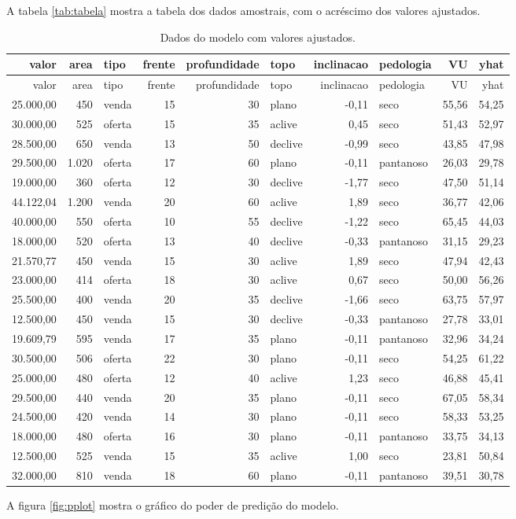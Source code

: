 \documentclass[a4paper, 12pt]{article}
\begin{document}
A tabela \ref{tab:tabela} mostra a tabela dos dados amostrais, com o
acréscimo dos valores ajustados.

\begin{longtable}[]{@{}rrlrrlrlrr@{}}
\caption{Dados do modelo com valores ajustados.}\tabularnewline
\toprule
valor & area & tipo & frente & profundidade & topo & inclinacao &
pedologia & VU & yhat\tabularnewline
\midrule
\endfirsthead
\toprule
valor & area & tipo & frente & profundidade & topo & inclinacao &
pedologia & VU & yhat\tabularnewline
\midrule
\endhead
25.000,00 & 450 & venda & 15 & 30 & plano & -0,11 & seco & 55,56 &
54,25\tabularnewline
30.000,00 & 525 & oferta & 15 & 35 & aclive & 0,45 & seco & 51,43 &
52,97\tabularnewline
28.500,00 & 650 & venda & 13 & 50 & declive & -0,99 & seco & 43,85 &
47,98\tabularnewline
29.500,00 & 1.020 & oferta & 17 & 60 & plano & -0,11 & pantanoso & 26,03
& 29,78\tabularnewline
19.000,00 & 360 & oferta & 12 & 30 & declive & -1,77 & seco & 47,50 &
51,14\tabularnewline
44.122,04 & 1.200 & venda & 20 & 60 & aclive & 1,89 & seco & 36,77 &
42,06\tabularnewline
40.000,00 & 550 & oferta & 10 & 55 & declive & -1,22 & seco & 65,45 &
44,03\tabularnewline
18.000,00 & 520 & oferta & 13 & 40 & declive & -0,33 & pantanoso & 31,15
& 29,23\tabularnewline
21.570,77 & 450 & venda & 15 & 30 & aclive & 1,89 & seco & 47,94 &
42,43\tabularnewline
23.000,00 & 414 & oferta & 18 & 30 & aclive & 0,67 & seco & 50,00 &
56,26\tabularnewline
25.500,00 & 400 & venda & 20 & 35 & declive & -1,66 & seco & 63,75 &
57,97\tabularnewline
12.500,00 & 450 & venda & 15 & 30 & declive & -0,33 & pantanoso & 27,78
& 33,01\tabularnewline
19.609,79 & 595 & venda & 17 & 35 & plano & -0,11 & pantanoso & 32,96 &
34,24\tabularnewline
30.500,00 & 506 & oferta & 22 & 30 & plano & -0,11 & seco & 54,25 &
61,22\tabularnewline
25.000,00 & 480 & oferta & 12 & 40 & aclive & 1,23 & seco & 46,88 &
45,41\tabularnewline
29.500,00 & 440 & venda & 20 & 35 & plano & -0,11 & seco & 67,05 &
58,34\tabularnewline
24.500,00 & 420 & venda & 14 & 30 & plano & -0,11 & seco & 58,33 &
53,25\tabularnewline
18.000,00 & 480 & oferta & 16 & 30 & plano & -0,11 & pantanoso & 33,75 &
34,13\tabularnewline
12.500,00 & 525 & venda & 15 & 35 & aclive & 1,00 & seco & 23,81 &
50,84\tabularnewline
32.000,00 & 810 & venda & 18 & 60 & plano & -0,11 & pantanoso & 39,51 &
30,78\tabularnewline
\bottomrule
\end{longtable}

A figura \ref{fig:pplot} mostra o gráfico do poder de predição do
modelo.
\end{document}
